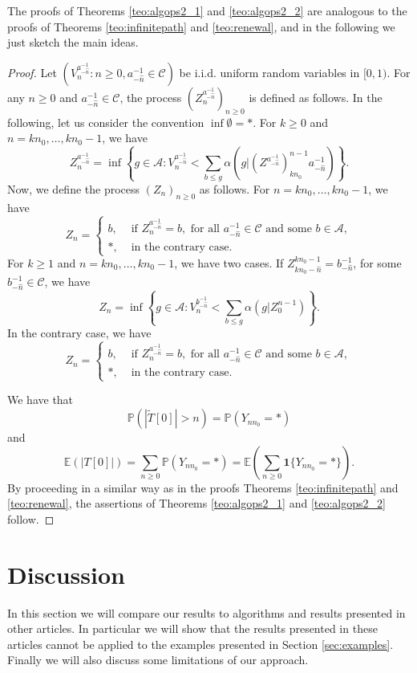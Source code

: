 \documentclass[a4paper]{article}
\def\P{{\mathbb P}}
\newcommand{\E}{\mathbb{E}}
\newcommand{\A}{\mathcal{A}}
\begin{document}
The proofs of Theorems \ref{teo:algops2_1} and \ref{teo:algops2_2} are analogous to the proofs of Theorems \ref{teo:infinitepath} and \ref{teo:renewal}, and in the following we just sketch the main ideas.

\begin{proof}
Let $(V_n^{a_{- \hat n}^{-1}}:n\geq0,a_{- \hat n}^{-1}\in \mathcal{C})$ be i.i.d. uniform random variables in $[0,1)$. For any $n\geq 0$ and $a_{- \hat n}^{-1}\in \mathcal{C}$, the process $(Z_n^{a_{-\hat n}^{-1}})_{n\geq 0}$ is defined as follows. In the following, let us consider the convention $\inf\emptyset=*$. For $k\geq0$ and $n=kn_0,\ldots,kn_0-1$, we have
\begin{equation*} 
Z_n^{a_{-\hat{n}}^{-1}}=\inf\left\{g\in \A: V_n^{a_{- \hat n}^{-1}}< \sum_{b\leq g}\alpha(g|(Z^{a_{-\hat{n}}^{-1}})_{kn_0}^{n-1}a_{-\hat{n}}^{-1})\right\}.
\end{equation*}
Now, we define the process $(Z_n)_{n\geq 0}$ as follows. For $n=kn_0,\ldots,kn_0-1$, we have
$$
Z_n=
\begin{cases}
b, &\text{ if } Z_n^{a_{-\hat{n}}^{-1}}=b, \text{ for all } a_{-\hat{n}}^{-1} \in \mathcal{C} \text{ and some } b\in \A,\\
*, &\text{ in the contrary case}.
\end{cases}
$$
For $k\geq 1$ and $n=kn_0,\ldots,kn_0-1$, we have two cases. If $Z_{kn_0-\hat n}^{kn_0-1}=b_{-\hat n}^{-1}$, for some $b_{-\hat n}^{-1} \in \mathcal{C}$, we have
\begin{equation*} 
Z_n=\inf\left\{g\in \A: V_n^{b_{- \hat n}^{-1}}< \sum_{b\leq g}\alpha(g|Z_{0}^{n-1})\right\}.
\end{equation*}
In the contrary case, we have
$$
Z_n=
\begin{cases}
b, &\text{ if } Z_n^{a_{-\hat{n}}^{-1}}=b, \text{ for all } a_{-\hat{n}}^{-1} \in \mathcal{C} \text{ and some } b\in \A,\\
*, &\text{ in the contrary case}.
\end{cases}
$$

We have that
$$
\P(|\tilde{T}[0]|>n)=\P(Y_{nn_0}=*)
$$
and
$$
\E(|T[0]|)=\sum_{n\geq 0} \P(Y_{nn_0}=*)=\E\left(\sum_{n\geq 0} \mathbf{1}\{Y_{nn_0}=*\}\right).
$$
By proceeding in a similar way as in the proofs Theorems \ref{teo:infinitepath} and \ref{teo:renewal}, the assertions of Theorems \ref{teo:algops2_1} and \ref{teo:algops2_2} follow. 
\end{proof}

\section{Discussion} \label{sec:dicussion}
In this section we will compare our results to algorithms and results presented in other articles. In particular we will show that the results presented in these articles cannot be applied to the examples presented in Section \ref{sec:examples}.
Finally we will also discuss some limitations of our approach. 
\end{document}

